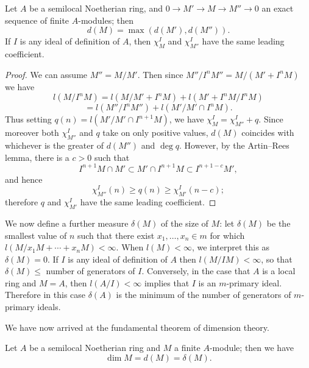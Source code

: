 \begin{theorem}\label{thm:13.3}
Let $A$ be a semilocal Noetherian ring, and $0 \to M' \to
M \to M'' \to 0$ an exact sequence of finite $A$-modules; then
\[
  d(M) = \max(d(M'), d(M'')).
\]
If $I$ is any ideal of definition of $A$, then $\chi_M^I$ and $\chi_{M''}^I$ have the same
leading coefficient.
\end{theorem}

\begin{proof}
We can assume $M'' = M/M'$. Then since $M''/I^nM'' = M/(M' + I^nM)$
we have
\[
  l(M/I^nM) = l(M/M' + I^nM) + l(M' + I^nM/I^nM)
\]
\[
  = l(M''/I^nM'') + l(M'/M' \cap I^nM).
\]
Thus setting $q(n) = l(M'/M' \cap I^{n+1}M)$, we have $\chi_M^I = \chi_{M''}^I + q$. Since
moreover both $\chi_{M''}^I$ and $q$ take on only positive values, $d(M)$ coincides with
whichever is the greater of $d(M'')$ and $\deg q$. However, by the Artin--Rees
lemma, there is a $c > 0$ such that
\[
  I^{n+1}M \cap M' \subset M' \cap I^{n+1}M \subset I^{n+1-c}M',
\]
and hence
\[
  \chi_{M''}^I(n) \ge q(n) \ge \chi_{M'}^I(n - c);
\]
therefore $q$ and $\chi_{M'}^I$ have the same leading coefficient.
\end{proof}

We now define a further measure $\delta(M)$ of the size of $M$: let $\delta(M)$ be the
smallest value of $n$ such that there exist $x_1, \ldots, x_n \in m$ for which $l(M/x_1M +
\cdots + x_nM) < \infty$. When $l(M) < \infty$, we interpret this as $\delta(M) = 0$. If $I$ is any
ideal of definition of $A$ then $l(M/IM) < \infty$, so that $\delta(M) \le$ number of
generators of $I$. Conversely, in the case that $A$ is a local ring and $M = A$,
then $l(A/I) < \infty$ implies that $I$ is an $m$-primary ideal. Therefore in this case
$\delta(A)$ is the minimum of the number of generators of $m$-primary ideals.

We have now arrived at the fundamental theorem of dimension theory.

\begin{theorem}\label{thm:13.4}
Let $A$ be a semilocal Noetherian ring and $M$ a finite
$A$-module; then we have
\[
  \dim M = d(M) = \delta(M).
\]
\end{theorem}

